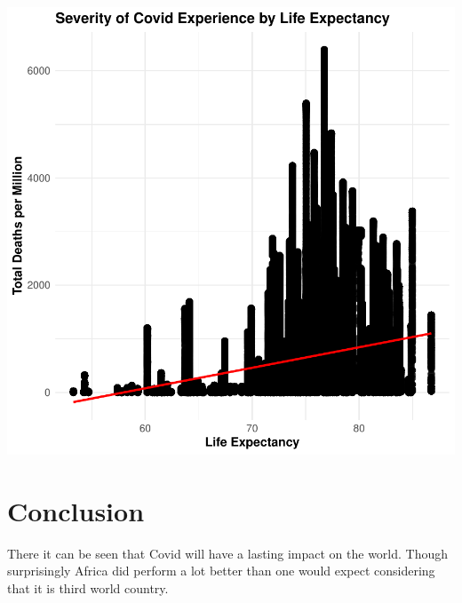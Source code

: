 \documentclass[12pt,preprint, authoryear]{elsarticle}
\let\origfigure\figure
\let\endorigfigure\endfigure
\renewenvironment{figure}[1][2] {
    \expandafter\origfigure\expandafter[H]
} {
    \endorigfigure
}
\numberwithin{equation}{section}
\numberwithin{figure}{section}
\numberwithin{table}{section}
\begin{document}
\begin{figure}[H]

{\centering \includegraphics{Q1_files/figure-latex/Figure10-1} 

}

\caption{Life Expectancy \label{Figure10}}\label{fig:Figure10}
\end{figure}

\hypertarget{conclusion}{%
\section{Conclusion}\label{conclusion}}

There it can be seen that Covid will have a lasting impact on the world.
Though surprisingly Africa did perform a lot better than one would
expect considering that it is third world country.


\end{document}
